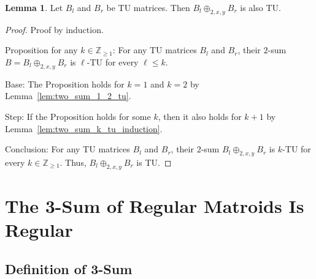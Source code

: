 \documentclass{article}
\theoremstyle{definition}
\newtheorem{lemma}[theorem]{Lemma}
\begin{document}
\begin{lemma}\label{lem:two_sum_tu}
    Let $B_{l}$ and $B_{r}$ be TU matrices. Then $B_{l} \oplus_{2, x, y} B_{r}$ is also TU.
\end{lemma}

\begin{proof}
    Proof by induction.

    Proposition for any $k \in \mathbb{Z}_{\geq 1}$: For any TU matrices $B_{l}$ and $B_{r}$, their $2$-sum $B = B_{l} \oplus_{2, x, y} B_{r}$ is $\ell$-TU for every $\ell \leq k$.

    Base: The Proposition holds for $k = 1$ and $k = 2$ by Lemma~\ref{lem:two_sum_1_2_tu}.

    Step: If the Proposition holds for some $k$, then it also holds for $k + 1$ by Lemma~\ref{lem:two_sum_k_tu_induction}.

    Conclusion: For any TU matrices $B_{l}$ and $B_{r}$, their $2$-sum $B_{l} \oplus_{2, x, y} B_{r}$ is $k$-TU for every $k \in \mathbb{Z}_{\geq 1}$. Thus, $B_{l} \oplus_{2, x, y} B_{r}$ is TU.
\end{proof}


\section{The 3-Sum of Regular Matroids Is Regular}

\subsection{Definition of 3-Sum}
\end{document}
